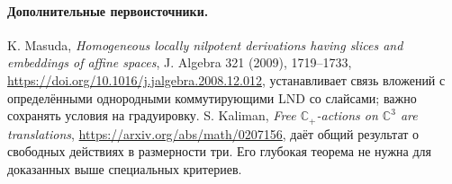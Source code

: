\paragraph{Дополнительные первоисточники.}
K. Masuda, \emph{Homogeneous locally nilpotent derivations having slices
and embeddings of affine spaces}, J. Algebra 321 (2009), 1719--1733,
\url{https://doi.org/10.1016/j.jalgebra.2008.12.012}, устанавливает
связь вложений с определёнными однородными коммутирующими LND со
слайсами; важно сохранять условия на градуировку.
S. Kaliman, \emph{Free $\mathbb C_+$-actions on $\mathbb C^3$ are
translations}, \url{https://arxiv.org/abs/math/0207156}, даёт общий
результат о свободных действиях в размерности три. Его глубокая теорема
не нужна для доказанных выше специальных критериев.
